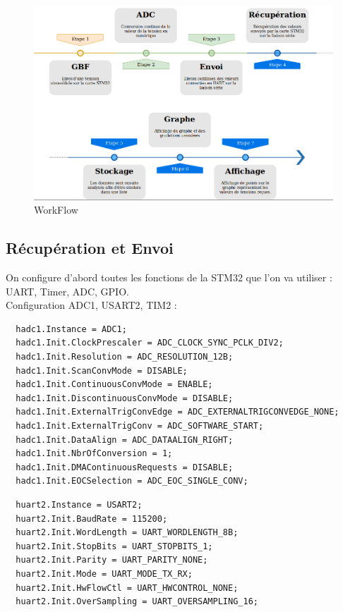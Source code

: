 \documentclass[11pt, french]{article}
\begin{document}
\vspace*{0.1cm}
\begin{figure}[htb]
\centering
\includegraphics[width=17cm]{Workflow33.png}
\caption{WorkFlow}
\label{fig:workflow}
\end{figure}
\vspace*{0.1cm}

\newpage

\subsection{Récupération et Envoi}

On configure d'abord toutes les fonctions de la STM32 que l'on va utiliser : UART, Timer, ADC, GPIO.\\

Configuration ADC1, USART2, TIM2 :

\vspace{3mm}
\begin{lstlisting}
  hadc1.Instance = ADC1;
  hadc1.Init.ClockPrescaler = ADC_CLOCK_SYNC_PCLK_DIV2;
  hadc1.Init.Resolution = ADC_RESOLUTION_12B;
  hadc1.Init.ScanConvMode = DISABLE;
  hadc1.Init.ContinuousConvMode = ENABLE;
  hadc1.Init.DiscontinuousConvMode = DISABLE;
  hadc1.Init.ExternalTrigConvEdge = ADC_EXTERNALTRIGCONVEDGE_NONE;
  hadc1.Init.ExternalTrigConv = ADC_SOFTWARE_START;
  hadc1.Init.DataAlign = ADC_DATAALIGN_RIGHT;
  hadc1.Init.NbrOfConversion = 1;
  hadc1.Init.DMAContinuousRequests = DISABLE;
  hadc1.Init.EOCSelection = ADC_EOC_SINGLE_CONV;
\end{lstlisting}

\vspace{3mm}
\begin{lstlisting}
  huart2.Instance = USART2;
  huart2.Init.BaudRate = 115200;
  huart2.Init.WordLength = UART_WORDLENGTH_8B;
  huart2.Init.StopBits = UART_STOPBITS_1;
  huart2.Init.Parity = UART_PARITY_NONE;
  huart2.Init.Mode = UART_MODE_TX_RX;
  huart2.Init.HwFlowCtl = UART_HWCONTROL_NONE;
  huart2.Init.OverSampling = UART_OVERSAMPLING_16;
\end{lstlisting}
\end{document}
